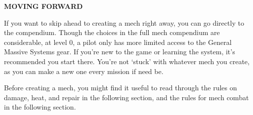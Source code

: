 \begin{center}
 \textbf{MOVING FORWARD}     
\end{center}

If you want to skip ahead to creating a mech right away, you can go directly to the compendium. Though the choices in the full mech compendium are considerable, at level 0, a pilot only has more limited access to the General Massive Systems gear. If you’re new to the game or learning the system, it’s recommended you start there. You’re not ‘stuck’ with whatever mech you create, as you can make a new one every mission if need be.

Before creating a mech, you might find it useful to read through the rules on damage, heat, and repair in the following section, and the rules for mech combat in the following section.

